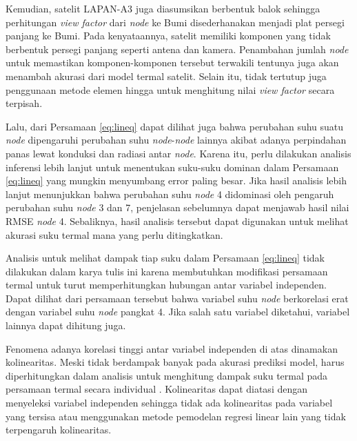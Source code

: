 Kemudian, satelit LAPAN-A3 juga diasumsikan berbentuk balok sehingga
perhitungan \textit{view factor} dari \textit{node} ke Bumi disederhanakan menjadi plat
persegi panjang ke Bumi. Pada kenyataannya, satelit memiliki komponen yang
tidak berbentuk persegi panjang seperti antena dan kamera. Penambahan jumlah
\textit{node} untuk memastikan komponen-komponen tersebut terwakili tentunya juga akan
menambah akurasi dari model termal satelit. Selain itu, tidak tertutup juga
penggunaan metode elemen hingga untuk menghitung nilai \textit{view factor}
secara terpisah.

Lalu, dari Persamaan \ref{eq:lineq} dapat dilihat juga bahwa perubahan suhu
suatu \textit{node} dipengaruhi perubahan suhu \textit{node}-\textit{node} lainnya akibat adanya
perpindahan panas lewat konduksi dan radiasi antar \textit{node}. Karena itu, perlu
dilakukan analisis inferensi lebih lanjut untuk menentukan suku-suku dominan
dalam Persamaan \ref{eq:lineq} yang mungkin menyumbang error paling besar. Jika
hasil analisis lebih lanjut menunjukkan bahwa perubahan suhu \textit{node} 4 didominasi
oleh pengaruh perubahan suhu \textit{node} 3 dan 7, penjelasan sebelumnya dapat menjawab
hasil nilai RMSE \textit{node} 4. Sebaliknya, hasil analisis tersebut dapat digunakan
untuk melihat akurasi suku termal mana yang perlu ditingkatkan.

Analisis untuk melihat dampak tiap suku dalam Persamaan \ref{eq:lineq} tidak
dilakukan dalam karya tulis ini karena membutuhkan modifikasi persamaan termal
untuk turut memperhitungkan hubungan antar variabel independen. Dapat dilihat
dari persamaan tersebut bahwa variabel suhu \textit{node} berkorelasi erat dengan
variabel suhu \textit{node} pangkat 4. Jika salah satu variabel diketahui, variabel
lainnya dapat dihitung juga. 

Fenomena adanya korelasi tinggi antar variabel independen di atas dinamakan
kolinearitas. Meski tidak berdampak banyak pada akurasi prediksi model,
harus diperhitungkan dalam analisis untuk menghitung dampak suku termal pada
persamaan termal secara individual \cite{lieberman2014}\cite{mundfrom2018}.
Kolinearitas dapat diatasi dengan menyeleksi variabel independen sehingga tidak
ada kolinearitas pada variabel yang tersisa atau menggunakan metode pemodelan
regresi linear lain yang tidak terpengaruh kolinearitas.

